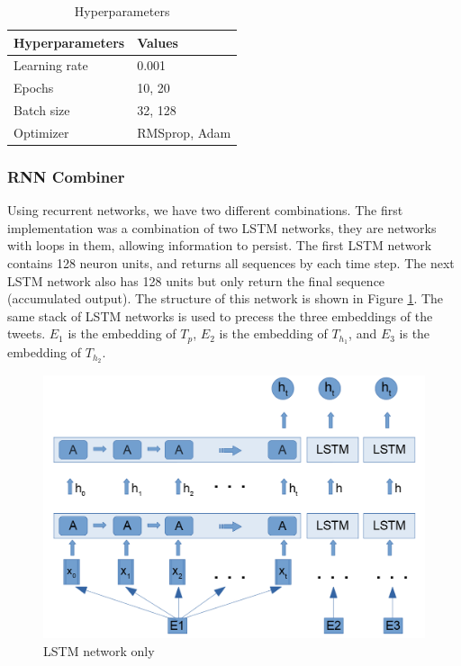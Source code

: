 \documentclass[12pt]{report}
\begin{document}
\begin{table}[htb]
	\centering
	\begin{tabular}{||M{4.5cm}|M{4cm}||}
		\hline
		\textbf{Hyperparameters} 	& \textbf{Values} 	\\ \hline
		Learning rate           	& 0.001     \\ \hline
		Epochs         				& 10, 20            \\ \hline
		Batch size           		& 32, 128 			\\ \hline		Optimizer                 	& RMSprop, Adam     \\ \hline	
	\end{tabular}
	\caption{Hyperparameters}\label{Hyperparameters}
\end{table}

\subsubsection{\ac{RNN} Combiner}
Using recurrent networks, we have two different combinations. The first implementation was a combination of two LSTM networks, they are networks with loops in them, allowing information to persist. The first LSTM network contains 128 neuron units, and returns all sequences by each time step. The next LSTM network  also has 128 units but only return the final sequence (accumulated output). The structure of this network is shown in Figure \ref{figure:lstm_only}. The same 
stack of LSTM networks is used to precess the three embeddings of the tweets. $E_1$ is the embedding of $T_p$, $E_2$ is the embedding of 
$T_{h_1}$, and $E_3$ is the embedding of $T_{h_2}$.

\begin{figure}[H]	
	\centering
	\includegraphics[width=150mm, scale = 1]{images/12_lstm_only.png}	
	\caption{LSTM network only}	
	\label{figure:lstm_only}
\end{figure}
\end{document}
